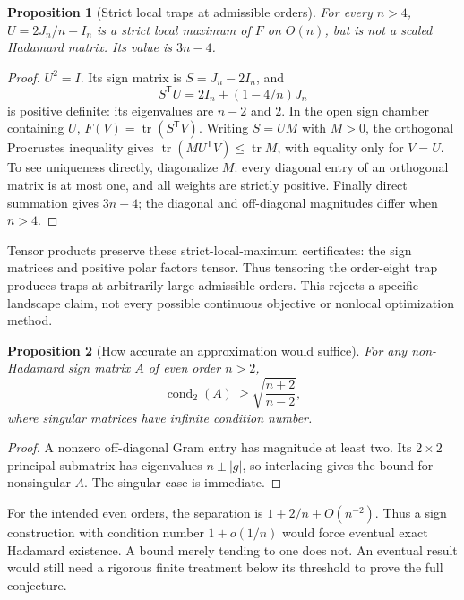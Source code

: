 \documentclass[11pt]{article}
\newtheorem{proposition}{Proposition}[section]
\begin{document}
\begin{proposition}[Strict local traps at admissible orders]
For every $n>4$, $U=2J_n/n-I_n$ is a strict local maximum of $F$ on
$O(n)$, but is not a scaled Hadamard matrix. Its value is $3n-4$.
\end{proposition}
\begin{proof}
$U^2=I$. Its sign matrix is $S=J_n-2I_n$, and
\[
 S^{\mathsf T}U=2I_n+(1-4/n)J_n
\]
is positive definite: its eigenvalues are $n-2$ and $2$. In the open
sign chamber containing $U$, $F(V)=\operatorname{tr}(S^{\mathsf T}V)$.
Writing $S=UM$ with $M>0$, the orthogonal Procrustes inequality gives
$\operatorname{tr}(M U^{\mathsf T}V)\le\operatorname{tr}M$, with
equality only for $V=U$. To see uniqueness directly, diagonalize $M$:
every diagonal entry of an orthogonal matrix is at most one, and all
weights are strictly positive. Finally direct summation gives $3n-4$;
the diagonal and off-diagonal magnitudes differ when $n>4$.
\end{proof}
Tensor products preserve these strict-local-maximum certificates:
the sign matrices and positive polar factors tensor. Thus tensoring
the order-eight trap produces traps at arbitrarily large admissible
orders. This rejects a specific landscape claim, not every possible
continuous objective or nonlocal optimization method.

\begin{proposition}[How accurate an approximation would suffice]
For any non-Hadamard sign matrix $A$ of even order $n>2$,
\[
 \operatorname{cond}_2(A)\ \ge\sqrt{\frac{n+2}{n-2}},
\]
where singular matrices have infinite condition number.
\end{proposition}
\begin{proof}
A nonzero off-diagonal Gram entry has magnitude at
least two. Its $2\times2$ principal submatrix has eigenvalues
$n\pm|g|$, so interlacing gives the bound for nonsingular $A$.
The singular case is immediate.
\end{proof}

For the intended even orders, the separation is $1+2/n+O(n^{-2})$.
Thus a sign construction with condition number $1+o(1/n)$ would force
eventual exact Hadamard existence. A bound merely tending to one does
not. An eventual result would still need a rigorous finite treatment
below its threshold to prove the full conjecture.
\end{document}
